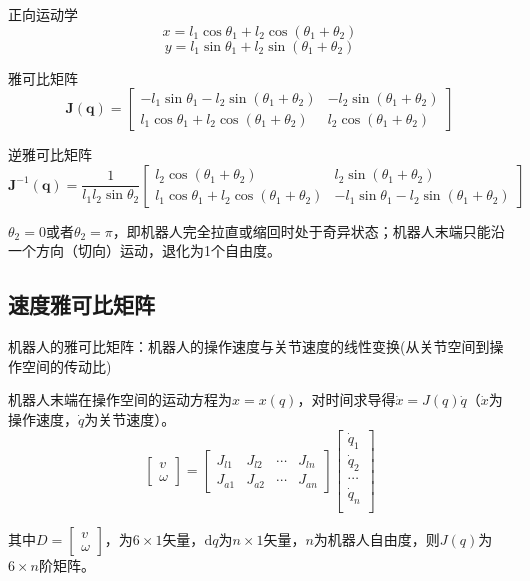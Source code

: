 正向运动学
$$
x = l_1 \cos\theta_1 + l_2 \cos(\theta_1 + \theta_2)
$$
$$
y = l_1 \sin\theta_1 + l_2 \sin(\theta_1 + \theta_2)
$$

雅可比矩阵
$$
\boldsymbol{J}(\boldsymbol{q}) = 
\begin{bmatrix}
-l_1 \sin\theta_1 - l_2 \sin(\theta_1 + \theta_2) & -l_2 \sin(\theta_1 + \theta_2) \\
l_1 \cos\theta_1 + l_2 \cos(\theta_1 + \theta_2) & l_2 \cos(\theta_1 + \theta_2)
\end{bmatrix}
$$

逆雅可比矩阵
$$
\boldsymbol{J}^{-1}(\boldsymbol{q}) = \frac{1}{l_1l_2\sin\theta_2}
\begin{bmatrix}
l_2 \cos(\theta_1 + \theta_2) & l_2 \sin(\theta_1 + \theta_2) \\
l_1 \cos\theta_1 + l_2 \cos(\theta_1 + \theta_2) & -l_1 \sin\theta_1 - l_2 \sin(\theta_1 + \theta_2)
\end{bmatrix}
$$

$\theta_2 = 0$或者$\theta_2 = \pi$，即机器人完全拉直或缩回时处于奇异状态；机器人末端只能沿一个方向（切向）运动，退化为1个自由度。

\subsection{速度雅可比矩阵}

机器人的雅可比矩阵：机器人的操作速度与关节速度的线性变换(从关节空间到操作空间的传动比)

机器人末端在操作空间的运动方程为$x=x(q)$，对时间求导得$\dot{x}=J(q)\dot{q}$（$\dot{x}$为操作速度，$\dot{q}$为关节速度）。
$$
\begin{bmatrix}v \\ \omega \end{bmatrix} = 
\begin{bmatrix}J_{l1} & J_{l2} & \cdots & J_{ln} \\ J_{a1} & J_{a2} & \cdots & J_{an} \end{bmatrix} \begin{bmatrix}\dot{q}_1 \\ \dot{q}_2 \\ \cdots \\ \dot{q}_n \\ \end{bmatrix}
$$

其中$D=\begin{bmatrix}v \\ \omega \end{bmatrix}$，为$6\times1$矢量，$\mathrm{d}q$为$n\times1$矢量，$n$为机器人自由度，则$J(q)$为$6\times n$阶矩阵。

